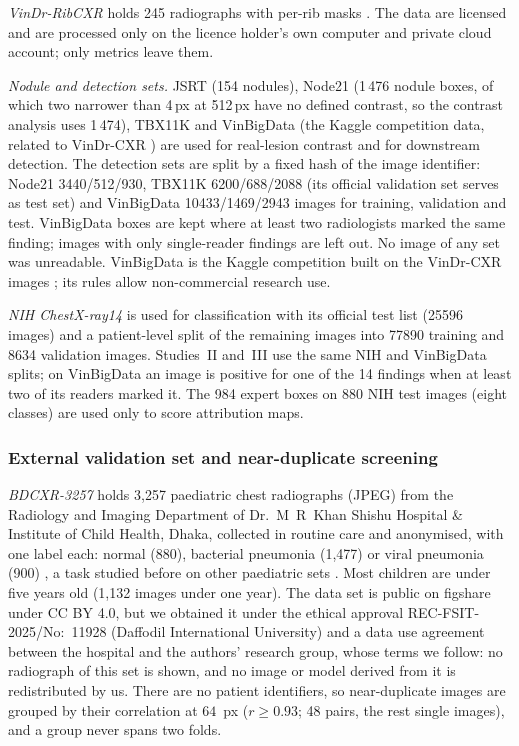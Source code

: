 \emph{VinDr-RibCXR} holds 245 radiographs with per-rib masks \cite{nguyen2021ribcxr}. The data are licensed and are processed only on the
licence holder's own computer and private cloud account; only metrics leave them.

\emph{Nodule and detection sets.} JSRT \cite{shiraishi2000jsrt} (154 nodules), Node21 \cite{sogancioglu2024node21} (1\,476 nodule boxes, of
which two narrower than 4\,px at 512\,px have no defined contrast, so the contrast analysis uses 1\,474), TBX11K \cite{liu2020tbx11k} and
VinBigData (the Kaggle competition data, related to VinDr-CXR \cite{nguyen2022vindrcxr}) are used for real-lesion contrast and for
downstream detection. The detection sets are split by a fixed hash of the image identifier: Node21 \num{3440}/\num{512}/\num{930}, TBX11K
\num{6200}/\num{688}/\num{2088} (its official validation set serves as test set) and VinBigData \num{10433}/\num{1469}/\num{2943} images
for training, validation and test. VinBigData boxes are kept where at least two radiologists marked the same finding; images with only
single-reader findings are left out. No image of any set was unreadable. VinBigData is the Kaggle competition built on the VinDr-CXR images
\cite{vinbigdata2020kaggle}; its rules allow non-commercial research use.

\emph{NIH ChestX-ray14} \cite{wang2017chestxray} is used for classification with its official test list (\num{25596} images) and a
patient-level split of the remaining images into \num{77890} training and \num{8634} validation images. Studies~II and~III use the same NIH
and VinBigData splits; on VinBigData an image is positive for one of the 14 findings when at least two of its readers marked it. The 984
expert boxes on 880 NIH test images (eight classes) are used only to score attribution maps.

\subsubsection{External validation set and near-duplicate screening}
\emph{BDCXR-3257} holds 3,257 paediatric chest radiographs (JPEG) from the Radiology and Imaging Department of Dr.~M~R~Khan Shishu Hospital
\& Institute of Child Health, Dhaka, collected in routine care and anonymised, with one label each: normal (880), bacterial pneumonia
(1,477) or viral pneumonia (900) \cite{durjoy2026bdcxr}, a task studied before on other paediatric sets \cite{kermany2018identifying}. Most
children are under five years old (1,132 images under one year). The data set is public on figshare under CC BY 4.0, but we obtained it
under the ethical approval REC-FSIT-2025/No:~11928 (Daffodil International University) and a data use agreement between the hospital and
the authors' research group, whose terms we follow: no radiograph of this set is shown, and no image or model derived from it is
redistributed by us. There are no patient identifiers, so near-duplicate images are grouped by their correlation at $64$~px
($r\ge0.93$; 48 pairs, the rest single images), and a group never spans two folds.


